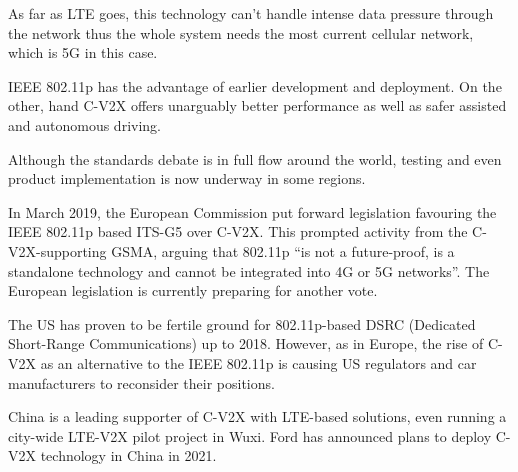 \documentclass[conference]{IEEEtran}
\begin{document}
As far as LTE goes, this technology can’t handle intense data pressure through the network thus the whole system needs the most current cellular network, which is 5G in this case.

IEEE 802.11p has the advantage of earlier development and deployment. On the other, hand C-V2X offers unarguably better performance as well as safer assisted and autonomous driving.

Although the standards debate is in full flow around the world, testing and even product implementation is now underway in some regions.

In March 2019, the European Commission put forward legislation favouring the IEEE 802.11p based ITS-G5 over C-V2X. This prompted activity from the C-V2X-supporting GSMA, arguing that 802.11p “is not a future-proof, is a standalone technology and cannot be integrated into 4G or 5G networks”. The European legislation is currently preparing for another vote.

The US has proven to be fertile ground for 802.11p-based DSRC (Dedicated Short-Range Communications) up to 2018. However,  as in Europe, the rise of C-V2X as an alternative to the IEEE 802.11p is causing US regulators and car manufacturers to reconsider their positions.

China is a leading supporter of C-V2X with LTE-based solutions, even running a city-wide LTE-V2X pilot project in Wuxi. Ford has announced plans to deploy C-V2X technology in China in 2021.
\end{document}
